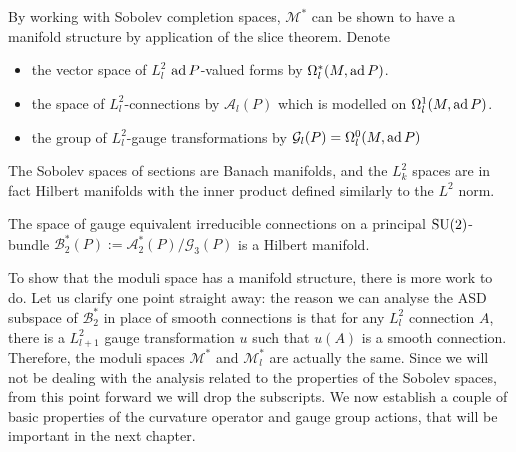By working with Sobolev completion
spaces, $\mathcal{M}^*$ can be shown to have a manifold structure by 
application of the slice theorem. Denote
\begin{itemize}
	\item the vector space of $L^2_l$ $\operatorname{ad} P$-valued forms by 
$\Omega^*_{l}(M,\operatorname{ad} P)$. 
	\item the space of $L^2_l$-connections by $\mathcal{A}_l(P)$ which is
		modelled on $\Omega^1_l(M,\operatorname{ad} P)$. 
	\item the group of $L^2_l$-gauge transformations by $\mathcal{G}_l(P) =
		\Omega^0_l(M,\operatorname{ad} P)$  
\end{itemize}
The Sobolev spaces of sections are Banach manifolds, and 
the $L^2_k$ spaces are in fact Hilbert manifolds with the inner product defined
similarly to the $L^2$ norm. 
\begin{comment}
However, we could work with
any Sobolev spaces for which the group of gauge transformations has at least two
derivatives, and the space of connections has one fewer derivative. 
\end{comment}

\begin{thm} 
	The space of gauge equivalent irreducible connections
    on a principal $\operatorname{SU}(2)$-bundle
	$\mathcal{B}^*_2(P) := \mathcal{A}^*_2(P) / \mathcal{G}_3(P)$ is a 
	Hilbert manifold. 
\end{thm}

To show that the moduli space has a manifold structure, there is more work to
do. Let us clarify one point straight away: the reason we can analyse the ASD 
subspace of $\mathcal{B}_2^*$ in place of smooth connections is that for any $L^2_l$ 
connection $A$, there is a $L^2_{l+1}$ gauge transformation $u$ such that
$u(A)$ is a smooth connection.\cite[Prop 4.2.16]{donaldson_kronheimer} 
Therefore, the moduli spaces  $\mathcal{M}^*$ 
and $\mathcal{M}^*_l$ are actually the same.
Since we will not be dealing with the analysis related to the properties of the
Sobolev spaces, from this point forward we will drop the subscripts.
We now establish a couple of basic properties of the curvature operator and gauge
group actions, that will be important in the next chapter.

\begin{comment}
The space of gauge connections $\mathcal{A}$ on a principal bundle is the
universal bundle for the group of gauge transformations $\mathcal{G}$. (ch 15
Cordes)
\end{comment}


